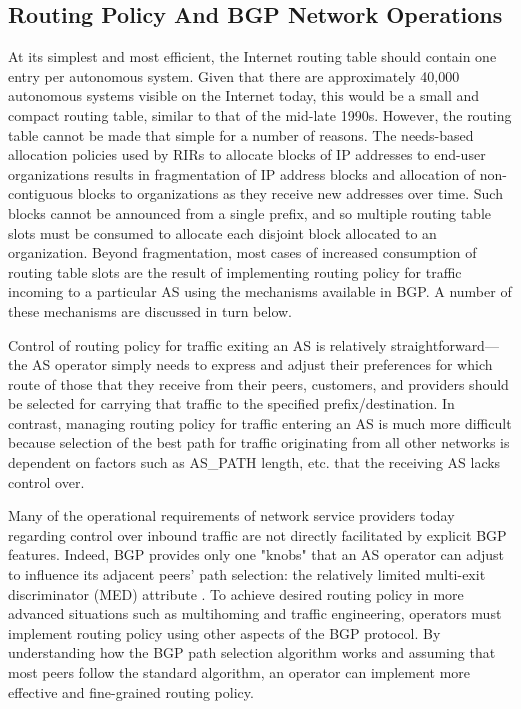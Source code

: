 \subsection{Routing Policy And BGP Network Operations}

At its simplest and most efficient, the Internet routing table should contain one entry per autonomous system. Given that there are approximately 40,000 autonomous systems visible on the Internet today, this would be a small and compact routing table, similar to that of the mid-late 1990s. However, the routing table cannot be made that simple for a number of reasons. The needs-based allocation policies used by RIRs \cite{rfc2050} to allocate blocks of IP addresses to end-user organizations results in fragmentation of IP address blocks and allocation of non-contiguous blocks to organizations as they receive new addresses over time. Such blocks cannot be announced from a single prefix, and so multiple routing table slots must be consumed to allocate each disjoint block allocated to an organization. Beyond fragmentation, most cases of increased consumption of routing table slots are the result of implementing routing policy for traffic incoming to a particular AS using the mechanisms available in BGP. A number of these mechanisms are discussed in turn below.

Control of routing policy for traffic exiting an AS is relatively straightforward---the AS operator simply needs to express and adjust their preferences for which route of those that they receive from their peers, customers, and providers should be selected for carrying that traffic to the specified prefix/destination. In contrast, managing routing policy for traffic entering an AS is much more difficult because selection of the best path for traffic originating from all other networks is dependent on factors such as AS\_PATH length, etc. that the receiving AS lacks control over.

Many of the operational requirements of network service providers today regarding control over inbound traffic are not directly facilitated by explicit BGP features. Indeed, BGP provides only one "knobs" that an AS operator can adjust to influence its adjacent peers' path selection: the relatively limited multi-exit discriminator (MED) attribute \cite{Beijnum:2002oq}. To achieve desired routing policy in more advanced situations such as multihoming and traffic engineering, operators must implement routing policy using other aspects of the BGP protocol. By understanding how the BGP path selection algorithm works and assuming that most peers follow the standard algorithm, an operator can implement more effective and fine-grained routing policy.

